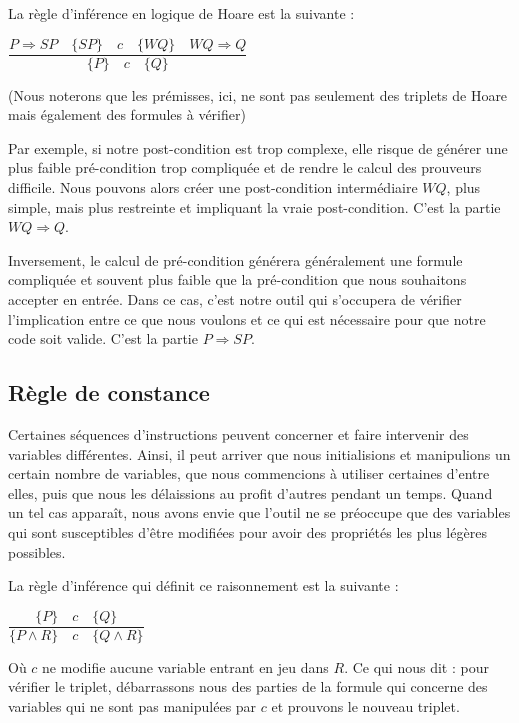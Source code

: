 \documentclass[12pt,francais,]{scrbook}
\begin{document}
La règle d'inférence en logique de Hoare est la suivante :

\begin{center}\(\dfrac{P \Rightarrow SP \quad \{SP\}\quad c\quad \{WQ\} \quad WQ \Rightarrow Q}{\{P\}\quad c \quad \{Q\}}\)\end{center}

(Nous noterons que les prémisses, ici, ne sont pas seulement des
triplets de Hoare mais également des formules à vérifier)

Par exemple, si notre post-condition est trop complexe, elle risque de
générer une plus faible pré-condition trop compliquée et de rendre le
calcul des prouveurs difficile. Nous pouvons alors créer une
post-condition intermédiaire \(WQ\), plus simple, mais plus restreinte
et impliquant la vraie post-condition. C'est la partie
\(WQ \Rightarrow Q\).

Inversement, le calcul de pré-condition générera généralement une
formule compliquée et souvent plus faible que la pré-condition que nous
souhaitons accepter en entrée. Dans ce cas, c'est notre outil qui
s'occupera de vérifier l'implication entre ce que nous voulons et ce qui
est nécessaire pour que notre code soit valide. C'est la partie
\(P \Rightarrow SP\).

\subsection{Règle de constance}\label{ruxe8gle-de-constance}

Certaines séquences d'instructions peuvent concerner et faire intervenir
des variables différentes. Ainsi, il peut arriver que nous initialisions
et manipulions un certain nombre de variables, que nous commencions à
utiliser certaines d'entre elles, puis que nous les délaissions au
profit d'autres pendant un temps. Quand un tel cas apparaît, nous avons
envie que l'outil ne se préoccupe que des variables qui sont
susceptibles d'être modifiées pour avoir des propriétés les plus légères
possibles.

La règle d'inférence qui définit ce raisonnement est la suivante :

\begin{center}
\(\dfrac{\{P\}\quad c\quad \{Q\}}{\{P \wedge R\}\quad c\quad \{Q \wedge R\}}\)
\end{center}

Où \(c\) ne modifie aucune variable entrant en jeu dans \(R\). Ce qui
nous dit : \og{}pour vérifier le triplet, débarrassons nous des parties de
la formule qui concerne des variables qui ne sont pas manipulées par
\(c\) et prouvons le nouveau triplet\fg{}.
\end{document}
